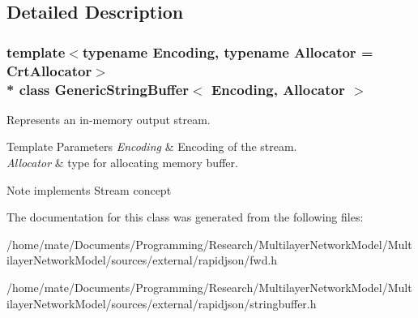 \subsection{Detailed Description}
\subsubsection*{template$<$typename Encoding, typename Allocator = Crt\+Allocator$>$\\*
class Generic\+String\+Buffer$<$ Encoding, Allocator $>$}

Represents an in-\/memory output stream. 


\begin{DoxyTemplParams}{Template Parameters}
{\em Encoding} & Encoding of the stream. \\
\hline
{\em Allocator} & type for allocating memory buffer. \\
\hline
\end{DoxyTemplParams}
\begin{DoxyNote}{Note}
implements Stream concept 
\end{DoxyNote}


The documentation for this class was generated from the following files\+:\begin{DoxyCompactItemize}
\item 
/home/mate/\+Documents/\+Programming/\+Research/\+Multilayer\+Network\+Model/\+Multilayer\+Network\+Model/sources/external/rapidjson/fwd.\+h\item 
/home/mate/\+Documents/\+Programming/\+Research/\+Multilayer\+Network\+Model/\+Multilayer\+Network\+Model/sources/external/rapidjson/stringbuffer.\+h\end{DoxyCompactItemize}
